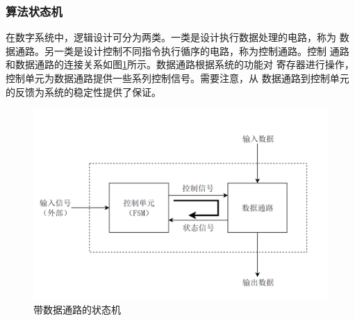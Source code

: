 \documentclass{article}
\numberwithin {equation}{section}
\begin{document}
\begin{spacing}{1.25}
        \subsubsection{算法状态机}
          \vspace{1em}
          在数字系统中，逻辑设计可分为两类。一类是设计执行数据处理的电路，称为
          数据通路。另一类是设计控制不同指令执行循序的电路，称为控制通路。控制
          通路和数据通路的连接关系如图\ref{asmd}所示。数据通路根据系统的功能对
          寄存器进行操作，控制单元为数据通路提供一些系列控制信号。需要注意，从
          数据通路到控制单元的反馈为系统的稳定性提供了保证。
          \begin{figure}[H]
            \centering
            \includegraphics[scale=0.5]{./pictures/ASMD.png}
            \caption{带数据通路的状态机}
            \label{asmd}
          \end{figure}
          

\end{spacing}
\end{document}
